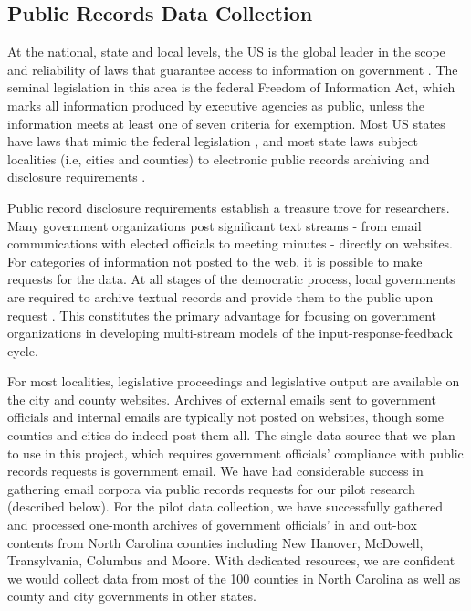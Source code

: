 \subsection{Public Records Data Collection}

 At the national, state and local levels, the US is the global leader in the scope and reliability of laws that guarantee access to information on government \cite{Halstuk2006}. The seminal legislation in this area is the federal Freedom of Information Act, which marks all information produced by executive agencies as public, unless the information meets at least one of seven criteria for exemption. Most US states have laws that mimic the federal legislation \cite{Braverman1980}, and most state laws subject localities (i.e, cities and counties) to electronic public records archiving and disclosure requirements \cite{Byrne2010}. 

  Public record disclosure requirements establish a treasure trove for researchers. Many government organizations post significant text streams - from email communications with elected officials to meeting minutes - directly on websites. For categories of information not posted to the web, it is possible to make requests for the data. At all stages of the democratic process, local governments are required to archive textual records and provide them to the public upon request \cite{Byrne2010}. This constitutes the primary advantage for focusing on government organizations in developing multi-stream models of the input-response-feedback cycle.

  For most localities, legislative proceedings and legislative output are available on the city and county websites. Archives of external emails sent to government officials and internal emails are typically not posted on websites, though some counties and cities do indeed post them all. The single data source that we plan to use in this project, which requires government officials' compliance with public records requests is government email. We have had considerable success in gathering email corpora via public records requests for our pilot research (described below). For the pilot data collection, we have successfully gathered and processed one-month archives of government officials' in and out-box contents from North Carolina counties including New Hanover, McDowell, Transylvania, Columbus and Moore. With dedicated resources, we are confident we would collect data from most of the 100 counties in North Carolina as well as county and city governments in other states. 



